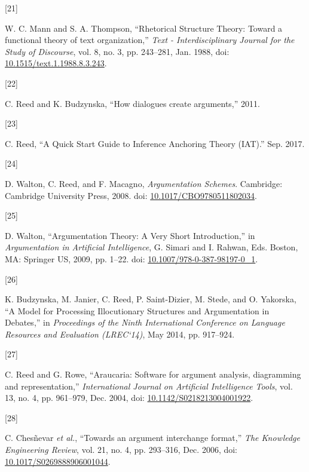 \documentclass[twocolumn,twoside]{article}
\newlength{\cslhangindent}
\newlength{\csllabelwidth}
\newenvironment{CSLReferences}[2] %
 {\begin{list}{}{%
  \setlength{\itemindent}{0pt}
  \setlength{\leftmargin}{0pt}
  \setlength{\parsep}{0pt}
  \ifodd #1
   \setlength{\leftmargin}{\cslhangindent}
   \setlength{\itemindent}{-1\cslhangindent}
  \fi
  \setlength{\itemsep}{#2\baselineskip}}}
 {\end{list}}
\newcommand{\CSLLeftMargin}[1]{\parbox[t]{\csllabelwidth}{\strut#1\strut}}
\newcommand{\CSLRightInline}[1]{\parbox[t]{\linewidth - \csllabelwidth}{\strut#1\strut}}
\begin{document}
\begin{CSLReferences}{0}{0}
\CSLLeftMargin{{[}21{]} }%
\CSLRightInline{W. C. Mann and S. A. Thompson, {``Rhetorical {Structure
Theory}: {Toward} a functional theory of text organization,''}
\emph{Text - Interdisciplinary Journal for the Study of Discourse}, vol.
8, no. 3, pp. 243--281, Jan. 1988, doi:
\href{https://doi.org/10.1515/text.1.1988.8.3.243}{10.1515/text.1.1988.8.3.243}.}

\CSLLeftMargin{{[}22{]} }%
\CSLRightInline{C. Reed and K. Budzynska, {``How dialogues create
arguments,''} 2011.}

\CSLLeftMargin{{[}23{]} }%
\CSLRightInline{C. Reed, {``A {Quick Start Guide} to {Inference
Anchoring Theory} ({IAT}).''} Sep. 2017.}

\CSLLeftMargin{{[}24{]} }%
\CSLRightInline{D. Walton, C. Reed, and F. Macagno, \emph{Argumentation
{Schemes}}. Cambridge: Cambridge University Press, 2008. doi:
\href{https://doi.org/10.1017/CBO9780511802034}{10.1017/CBO9780511802034}.}

\CSLLeftMargin{{[}25{]} }%
\CSLRightInline{D. Walton, {``Argumentation {Theory}: {A Very Short
Introduction},''} in \emph{Argumentation in {Artificial Intelligence}},
G. Simari and I. Rahwan, Eds. Boston, MA: Springer US, 2009, pp. 1--22.
doi:
\href{https://doi.org/10.1007/978-0-387-98197-0_1}{10.1007/978-0-387-98197-0\_1}.}

\CSLLeftMargin{{[}26{]} }%
\CSLRightInline{K. Budzynska, M. Janier, C. Reed, P. Saint-Dizier, M.
Stede, and O. Yakorska, {``A {Model} for {Processing Illocutionary
Structures} and {Argumentation} in {Debates},''} in \emph{Proceedings of
the {Ninth International Conference} on {Language Resources} and
{Evaluation} ({LREC}`14)}, May 2014, pp. 917--924.}

\CSLLeftMargin{{[}27{]} }%
\CSLRightInline{C. Reed and G. Rowe, {``Araucaria: Software for argument
analysis, diagramming and representation,''} \emph{International Journal
on Artificial Intelligence Tools}, vol. 13, no. 4, pp. 961--979, Dec.
2004, doi:
\href{https://doi.org/10.1142/S0218213004001922}{10.1142/S0218213004001922}.}

\CSLLeftMargin{{[}28{]} }%
\CSLRightInline{C. Chesñevar \emph{et al.}, {``Towards an argument
interchange format,''} \emph{The Knowledge Engineering Review}, vol. 21,
no. 4, pp. 293--316, Dec. 2006, doi:
\href{https://doi.org/10.1017/S0269888906001044}{10.1017/S0269888906001044}.}


\end{CSLReferences}
\end{document}
